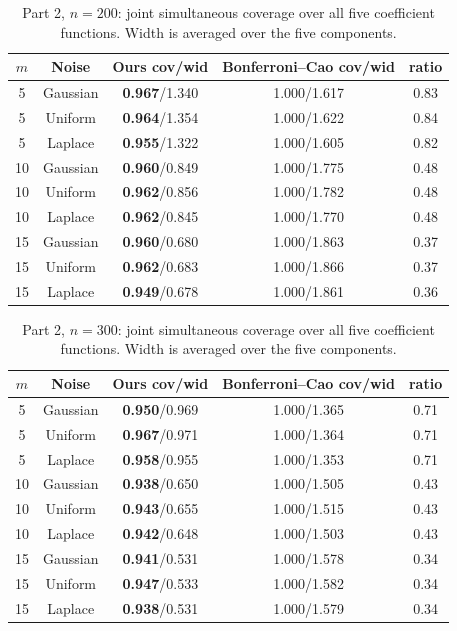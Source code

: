 \begin{table}[t!]
\caption{Part 2, \(n=200\): joint simultaneous coverage over all five
coefficient functions. Width is averaged over the five components.}
\label{tab:part2-200}\par
\begin{center}
\begin{tabular}{|ccccc|}
\hline
\(m\) & Noise & {\bf Ours cov/wid} & Bonferroni--Cao cov/wid & ratio \\
\hline
5  & Gaussian & {\bf 0.967}/1.340 & 1.000/1.617 & 0.83 \\
5  & Uniform  & {\bf 0.964}/1.354 & 1.000/1.622 & 0.84 \\
5  & Laplace  & {\bf 0.955}/1.322 & 1.000/1.605 & 0.82 \\
10 & Gaussian & {\bf 0.960}/0.849 & 1.000/1.775 & 0.48 \\
10 & Uniform  & {\bf 0.962}/0.856 & 1.000/1.782 & 0.48 \\
10 & Laplace  & {\bf 0.962}/0.845 & 1.000/1.770 & 0.48 \\
15 & Gaussian & {\bf 0.960}/0.680 & 1.000/1.863 & 0.37 \\
15 & Uniform  & {\bf 0.962}/0.683 & 1.000/1.866 & 0.37 \\
15 & Laplace  & {\bf 0.949}/0.678 & 1.000/1.861 & 0.36 \\
\hline
\end{tabular}
\end{center}
\end{table}

\begin{table}[t!]
\caption{Part 2, \(n=300\): joint simultaneous coverage over all five
coefficient functions. Width is averaged over the five components.}
\label{tab:part2-300}\par
\begin{center}
\begin{tabular}{|ccccc|}
\hline
\(m\) & Noise & {\bf Ours cov/wid} & Bonferroni--Cao cov/wid & ratio \\
\hline
5  & Gaussian & {\bf 0.950}/0.969 & 1.000/1.365 & 0.71 \\
5  & Uniform  & {\bf 0.967}/0.971 & 1.000/1.364 & 0.71 \\
5  & Laplace  & {\bf 0.958}/0.955 & 1.000/1.353 & 0.71 \\
10 & Gaussian & {\bf 0.938}/0.650 & 1.000/1.505 & 0.43 \\
10 & Uniform  & {\bf 0.943}/0.655 & 1.000/1.515 & 0.43 \\
10 & Laplace  & {\bf 0.942}/0.648 & 1.000/1.503 & 0.43 \\
15 & Gaussian & {\bf 0.941}/0.531 & 1.000/1.578 & 0.34 \\
15 & Uniform  & {\bf 0.947}/0.533 & 1.000/1.582 & 0.34 \\
15 & Laplace  & {\bf 0.938}/0.531 & 1.000/1.579 & 0.34 \\
\hline
\end{tabular}
\end{center}
\end{table}

